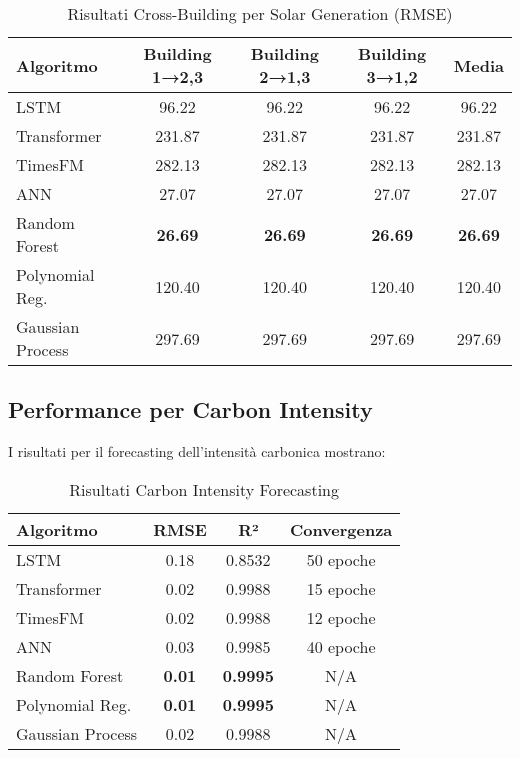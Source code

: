 \documentclass[12pt,a4paper,twoside]{report}
\begin{document}
\begin{appendices}
\begin{table}[H]
\centering
\caption{Risultati Cross-Building per Solar Generation (RMSE)}
\label{tab:cross_building_detailed}
\begin{tabular}{|l|c|c|c|c|}
\hline
\textbf{Algoritmo} & \textbf{Building 1→2,3} & \textbf{Building 2→1,3} & \textbf{Building 3→1,2} & \textbf{Media} \\
\hline
LSTM & 96.22 & 96.22 & 96.22 & 96.22 \\
Transformer & 231.87 & 231.87 & 231.87 & 231.87 \\
TimesFM & 282.13 & 282.13 & 282.13 & 282.13 \\
ANN & 27.07 & 27.07 & 27.07 & 27.07 \\
Random Forest & \textbf{26.69} & \textbf{26.69} & \textbf{26.69} & \textbf{26.69} \\
Polynomial Reg. & 120.40 & 120.40 & 120.40 & 120.40 \\
Gaussian Process & 297.69 & 297.69 & 297.69 & 297.69 \\
\hline
\end{tabular}
\end{table}

\subsection{Performance per Carbon Intensity}

I risultati per il forecasting dell'intensità carbonica mostrano:

\begin{table}[H]
\centering
\caption{Risultati Carbon Intensity Forecasting}
\label{tab:carbon_detailed}
\begin{tabular}{|l|c|c|c|}
\hline
\textbf{Algoritmo} & \textbf{RMSE} & \textbf{R²} & \textbf{Convergenza} \\
\hline
LSTM & 0.18 & 0.8532 & 50 epoche \\
Transformer & 0.02 & 0.9988 & 15 epoche \\
TimesFM & 0.02 & 0.9988 & 12 epoche \\
ANN & 0.03 & 0.9985 & 40 epoche \\
Random Forest & \textbf{0.01} & \textbf{0.9995} & N/A \\
Polynomial Reg. & \textbf{0.01} & \textbf{0.9995} & N/A \\
Gaussian Process & 0.02 & 0.9988 & N/A \\
\hline
\end{tabular}
\end{table}


\end{appendices}
\end{document}
